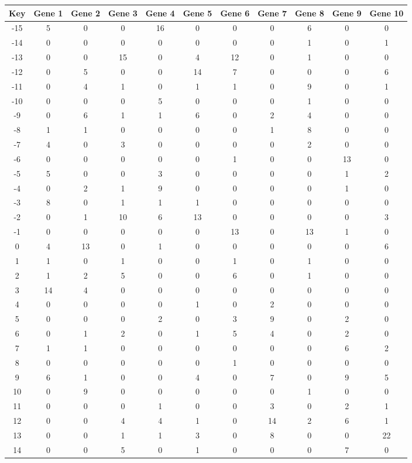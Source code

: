 \begin{tabular}{|c|c|c|c|c|c|c|c|c|c|c|}
\hline
Key & Gene 1 & Gene 2 & Gene 3 & Gene 4 & Gene 5 & Gene 6 & Gene 7 & Gene 8 & Gene 9 & Gene 10 \\
\hline
-15 & 5 & 0 & 0 & 16 & 0 & 0 & 0 & 6 & 0 & 0 \\
-14 & 0 & 0 & 0 & 0 & 0 & 0 & 0 & 1 & 0 & 1 \\
-13 & 0 & 0 & 15 & 0 & 4 & 12 & 0 & 1 & 0 & 0 \\
-12 & 0 & 5 & 0 & 0 & 14 & 7 & 0 & 0 & 0 & 6 \\
-11 & 0 & 4 & 1 & 0 & 1 & 1 & 0 & 9 & 0 & 1 \\
-10 & 0 & 0 & 0 & 5 & 0 & 0 & 0 & 1 & 0 & 0 \\
-9 & 0 & 6 & 1 & 1 & 6 & 0 & 2 & 4 & 0 & 0 \\
-8 & 1 & 1 & 0 & 0 & 0 & 0 & 1 & 8 & 0 & 0 \\
-7 & 4 & 0 & 3 & 0 & 0 & 0 & 0 & 2 & 0 & 0 \\
-6 & 0 & 0 & 0 & 0 & 0 & 1 & 0 & 0 & 13 & 0 \\
-5 & 5 & 0 & 0 & 3 & 0 & 0 & 0 & 0 & 1 & 2 \\
-4 & 0 & 2 & 1 & 9 & 0 & 0 & 0 & 0 & 1 & 0 \\
-3 & 8 & 0 & 1 & 1 & 1 & 0 & 0 & 0 & 0 & 0 \\
-2 & 0 & 1 & 10 & 6 & 13 & 0 & 0 & 0 & 0 & 3 \\
-1 & 0 & 0 & 0 & 0 & 0 & 13 & 0 & 13 & 1 & 0 \\
0 & 4 & 13 & 0 & 1 & 0 & 0 & 0 & 0 & 0 & 6 \\
1 & 1 & 0 & 1 & 0 & 0 & 1 & 0 & 1 & 0 & 0 \\
2 & 1 & 2 & 5 & 0 & 0 & 6 & 0 & 1 & 0 & 0 \\
3 & 14 & 4 & 0 & 0 & 0 & 0 & 0 & 0 & 0 & 0 \\
4 & 0 & 0 & 0 & 0 & 1 & 0 & 2 & 0 & 0 & 0 \\
5 & 0 & 0 & 0 & 2 & 0 & 3 & 9 & 0 & 2 & 0 \\
6 & 0 & 1 & 2 & 0 & 1 & 5 & 4 & 0 & 2 & 0 \\
7 & 1 & 1 & 0 & 0 & 0 & 0 & 0 & 0 & 6 & 2 \\
8 & 0 & 0 & 0 & 0 & 0 & 1 & 0 & 0 & 0 & 0 \\
9 & 6 & 1 & 0 & 0 & 4 & 0 & 7 & 0 & 9 & 5 \\
10 & 0 & 9 & 0 & 0 & 0 & 0 & 0 & 1 & 0 & 0 \\
11 & 0 & 0 & 0 & 1 & 0 & 0 & 3 & 0 & 2 & 1 \\
12 & 0 & 0 & 4 & 4 & 1 & 0 & 14 & 2 & 6 & 1 \\
13 & 0 & 0 & 1 & 1 & 3 & 0 & 8 & 0 & 0 & 22 \\
14 & 0 & 0 & 5 & 0 & 1 & 0 & 0 & 0 & 7 & 0 \\
\hline
\end{tabular}